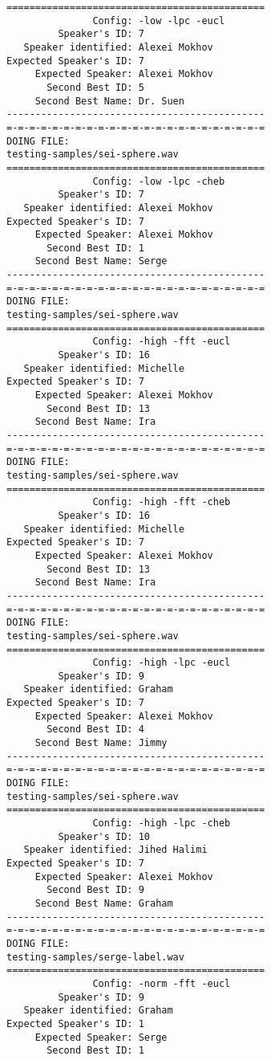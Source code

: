 \begin{verbatim}
=============================================
               Config: -low -lpc -eucl
         Speaker's ID: 7
   Speaker identified: Alexei Mokhov
Expected Speaker's ID: 7
     Expected Speaker: Alexei Mokhov
       Second Best ID: 5
     Second Best Name: Dr. Suen
---------------------------------------------
=-=-=-=-=-=-=-=-=-=-=-=-=-=-=-=-=-=-=-=-=-=-=
DOING FILE:
testing-samples/sei-sphere.wav
=============================================
               Config: -low -lpc -cheb
         Speaker's ID: 7
   Speaker identified: Alexei Mokhov
Expected Speaker's ID: 7
     Expected Speaker: Alexei Mokhov
       Second Best ID: 1
     Second Best Name: Serge
---------------------------------------------
=-=-=-=-=-=-=-=-=-=-=-=-=-=-=-=-=-=-=-=-=-=-=
DOING FILE:
testing-samples/sei-sphere.wav
=============================================
               Config: -high -fft -eucl
         Speaker's ID: 16
   Speaker identified: Michelle
Expected Speaker's ID: 7
     Expected Speaker: Alexei Mokhov
       Second Best ID: 13
     Second Best Name: Ira
---------------------------------------------
=-=-=-=-=-=-=-=-=-=-=-=-=-=-=-=-=-=-=-=-=-=-=
DOING FILE:
testing-samples/sei-sphere.wav
=============================================
               Config: -high -fft -cheb
         Speaker's ID: 16
   Speaker identified: Michelle
Expected Speaker's ID: 7
     Expected Speaker: Alexei Mokhov
       Second Best ID: 13
     Second Best Name: Ira
---------------------------------------------
=-=-=-=-=-=-=-=-=-=-=-=-=-=-=-=-=-=-=-=-=-=-=
DOING FILE:
testing-samples/sei-sphere.wav
=============================================
               Config: -high -lpc -eucl
         Speaker's ID: 9
   Speaker identified: Graham
Expected Speaker's ID: 7
     Expected Speaker: Alexei Mokhov
       Second Best ID: 4
     Second Best Name: Jimmy
---------------------------------------------
=-=-=-=-=-=-=-=-=-=-=-=-=-=-=-=-=-=-=-=-=-=-=
DOING FILE:
testing-samples/sei-sphere.wav
=============================================
               Config: -high -lpc -cheb
         Speaker's ID: 10
   Speaker identified: Jihed Halimi
Expected Speaker's ID: 7
     Expected Speaker: Alexei Mokhov
       Second Best ID: 9
     Second Best Name: Graham
---------------------------------------------
=-=-=-=-=-=-=-=-=-=-=-=-=-=-=-=-=-=-=-=-=-=-=
DOING FILE:
testing-samples/serge-label.wav
=============================================
               Config: -norm -fft -eucl
         Speaker's ID: 9
   Speaker identified: Graham
Expected Speaker's ID: 1
     Expected Speaker: Serge
       Second Best ID: 1

\end{verbatim}
